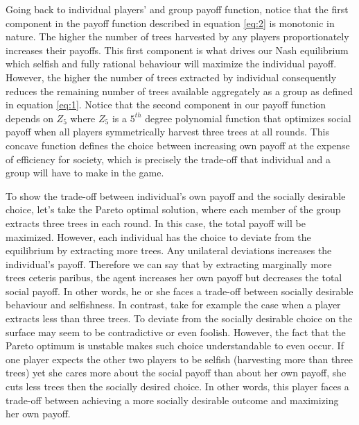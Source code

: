  Going back to individual players' and group payoff function, notice that the first component in the payoff function described in equation \ref{eq:2} is monotonic in nature. The higher the number of trees harvested by any players proportionately increases their payoffs. This first component is what drives our Nash equilibrium which selfish and fully rational behaviour will maximize the individual payoff. However, the higher the number of trees extracted by individual consequently reduces the remaining number of trees available aggregately as a group as defined in equation \ref{eq:1}. Notice that the second component in our payoff function depends on $Z_5$ where $Z_5$ is a $5^{th}$ degree polynomial function that optimizes social payoff when all players symmetrically harvest three trees at all rounds. This concave function defines the choice between increasing own payoff at the expense of efficiency for society, which is precisely the trade-off that individual and a group will have to make in the game.

 To show the trade-off between individual's own payoff and the socially desirable choice, let's take the Pareto optimal solution, where each member of the group extracts three trees in each round. In this case, the total payoff will be maximized. However, each individual has the choice to deviate from the equilibrium by extracting more trees. Any unilateral deviations increases the individual's payoff. Therefore we can say that by extracting marginally more trees ceteris paribus, the agent increases her own payoff but decreases the total social payoff. In other words, he or she faces a trade-off between socially desirable behaviour and selfishness. In contrast, take for example the case when a player extracts less than three trees. To deviate from the socially desirable choice on the surface may seem to be contradictive or even foolish. However, the fact that the Pareto optimum is unstable makes such choice understandable to even occur. If one player expects the other two players to be selfish (harvesting more than three trees) yet she cares more about the social payoff than about her own payoff, she cuts less trees then the socially desired choice. In other words, this player faces a trade-off between achieving a more socially desirable outcome and maximizing her own payoff.

